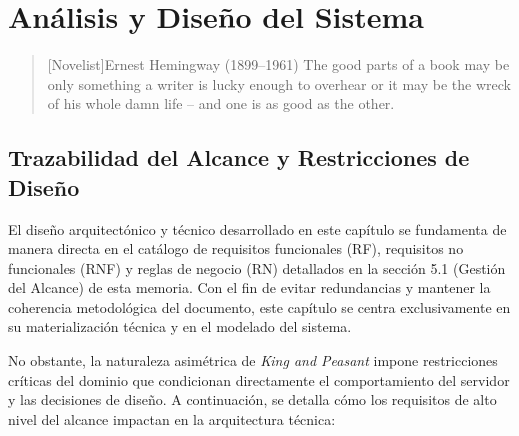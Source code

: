 \chapter{Análisis y Diseño del Sistema}

\begin{quotation}[Novelist]{Ernest Hemingway (1899--1961)}
The good parts of a book may be only something a writer is lucky enough to overhear or it may be the wreck of his whole damn life -- and one is as good as the other.
\end{quotation}

\begin{abstract}
En este capítulo se aborda el modelado técnico y el diseño arquitectónico del sistema. Tomando como base el catálogo de requisitos y las reglas del dominio definidos previamente en la fase de planificación, se modela la interacción de los usuarios mediante diagramas de Casos de Uso y de Secuencia. Asimismo, se describe en detalle la arquitectura de software por capas, la estrategia del monorepositorio y el modelo de datos híbrido diseñado para garantizar la seguridad y el rendimiento en tiempo real.
\end{abstract}

\section{Trazabilidad del Alcance y Restricciones de Diseño}

El diseño arquitectónico y técnico desarrollado en este capítulo se fundamenta de manera directa en el catálogo de requisitos funcionales (RF), requisitos no funcionales (RNF) y reglas de negocio (RN) detallados en la sección 5.1 (Gestión del Alcance) de esta memoria. Con el fin de evitar redundancias y mantener la coherencia metodológica del documento, este capítulo se centra exclusivamente en su materialización técnica y en el modelado del sistema.

No obstante, la naturaleza asimétrica de \textit{King and Peasant} impone restricciones críticas del dominio que condicionan directamente el comportamiento del servidor y las decisiones de diseño. A continuación, se detalla cómo los requisitos de alto nivel del alcance impactan en la arquitectura técnica:

